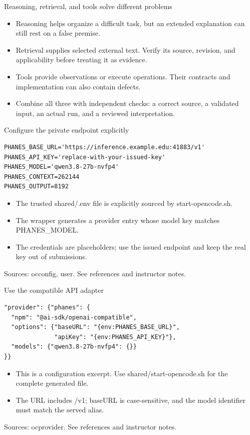 \documentclass[aspectratio=169,11pt]{beamer}
\begin{document}
\begin{frame}[t,fragile]{Reasoning, retrieval, and tools solve different problems}
\fontsize{11.5}{14}\selectfont
\begin{itemize}\setlength{\itemsep}{2mm}
\item Reasoning helps organize a difficult task, but an extended explanation can still rest on a false premise.
\item Retrieval supplies selected external text. Verify its source, revision, and applicability before treating it as evidence.
\item Tools provide observations or execute operations. Their contracts and implementation can also contain defects.
\item Combine all three with independent checks: a correct source, a validated input, an actual run, and a reviewed interpretation.
\end{itemize}
\end{frame}
\begin{frame}[t,fragile]{Configure the private endpoint explicitly}
\begin{lstlisting}
PHANES_BASE_URL='https://inference.example.edu:41883/v1'
PHANES_API_KEY='replace-with-your-issued-key'
PHANES_MODEL='qwen3.8-27b-nvfp4'
PHANES_CONTEXT=262144
PHANES_OUTPUT=8192
\end{lstlisting}
\fontsize{10.5}{12.5}\selectfont
\begin{itemize}\setlength{\itemsep}{2mm}
\item The trusted shared/.env file is explicitly sourced by start-opencode.sh.
\item The wrapper generates a provider entry whose model key matches PHANES\_MODEL.
\item The credentials are placeholders; use the issued endpoint and keep the real key out of submissions.
\end{itemize}
\vfill{\fontsize{6.5}{8}\selectfont\color{UTgray} Sources: occonfig, user. See references and instructor notes.\par}
\end{frame}
\begin{frame}[t,fragile]{Use the compatible API adapter}
\begin{lstlisting}
"provider": {"phanes": {
  "npm": "@ai-sdk/openai-compatible",
  "options": {"baseURL": "{env:PHANES_BASE_URL}",
              "apiKey": "{env:PHANES_API_KEY}"},
  "models": {"qwen3.8-27b-nvfp4": {}}
}}
\end{lstlisting}
\fontsize{10.5}{12.5}\selectfont
\begin{itemize}\setlength{\itemsep}{2mm}
\item This is a configuration excerpt. Use shared/start-opencode.sh for the complete generated file.
\item The URL includes /v1; baseURL is case-sensitive, and the model identifier must match the served alias.
\end{itemize}
\vfill{\fontsize{6.5}{8}\selectfont\color{UTgray} Sources: ocprovider. See references and instructor notes.\par}
\end{frame}
\end{document}
